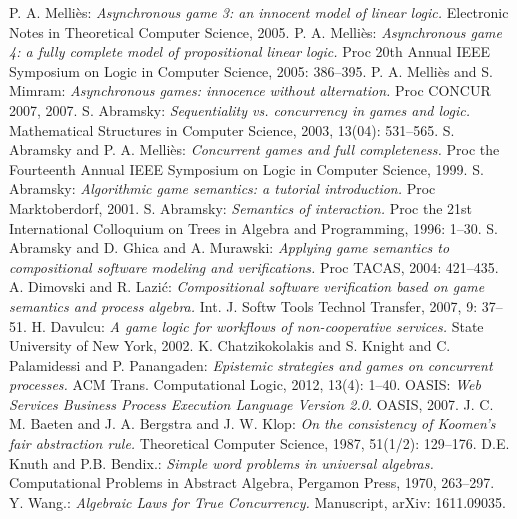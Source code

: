 \documentclass{fac}
\begin{document}
\begin{thebibliography}{Lam94}
   P. A. Melli\`{e}s: \emph{Asynchronous game 3: an innocent model of linear logic.} Electronic Notes in Theoretical Computer Science, 2005.
   P. A. Melli\`{e}s: \emph{Asynchronous game 4: a fully complete model of propositional linear logic.} Proc 20th Annual IEEE Symposium on Logic in Computer Science, 2005: 386--395.
   P. A. Melli\`{e}s and S. Mimram: \emph{Asynchronous games: innocence without alternation.} Proc CONCUR 2007, 2007.
   S. Abramsky: \emph{Sequentiality vs. concurrency in games and logic.} Mathematical Structures in Computer Science, 2003, 13(04): 531--565.
   S. Abramsky and P. A. Melli\`{e}s: \emph{Concurrent games and full completeness.} Proc the Fourteenth Annual IEEE Symposium on Logic in Computer Science, 1999.
   S. Abramsky: \emph{Algorithmic game semantics: a tutorial introduction.} Proc Marktoberdorf, 2001.
   S. Abramsky: \emph{Semantics of interaction.} Proc the 21st International Colloquium on Trees in Algebra and Programming, 1996: 1--30.
   S. Abramsky and D. Ghica and A. Murawski: \emph{Applying game semantics to compositional software modeling and verifications.} Proc TACAS, 2004: 421--435.
   A. Dimovski and R. Lazi\'{c}: \emph{Compositional software verification based on game semantics and process algebra.} Int. J. Softw Tools Technol Transfer, 2007, 9: 37--51.
   H. Davulcu: \emph{A game logic for workflows of non-cooperative services.} State University of New York, 2002.
   K. Chatzikokolakis and S. Knight and C. Palamidessi and P. Panangaden: \emph{Epistemic strategies and games on concurrent processes.} ACM Trans. Computational Logic, 2012, 13(4): 1--40.
   OASIS: \emph{Web Services Business Process Execution Language Version 2.0.} OASIS, 2007.
   J. C. M. Baeten and J. A. Bergstra and J. W. Klop: \emph{On the consistency of Koomen's fair abstraction rule.} Theoretical Computer Science, 1987, 51(1/2): 129--176.
   D.E. Knuth and P.B. Bendix.: \emph{Simple word problems in universal algebras.} Computational Problems in Abstract Algebra, Pergamon Press, 1970, 263--297.
   Y. Wang.: \emph{Algebraic Laws for True Concurrency.} Manuscript, arXiv: 1611.09035.
\end{thebibliography}



\label{lastpage}
\end{document}
